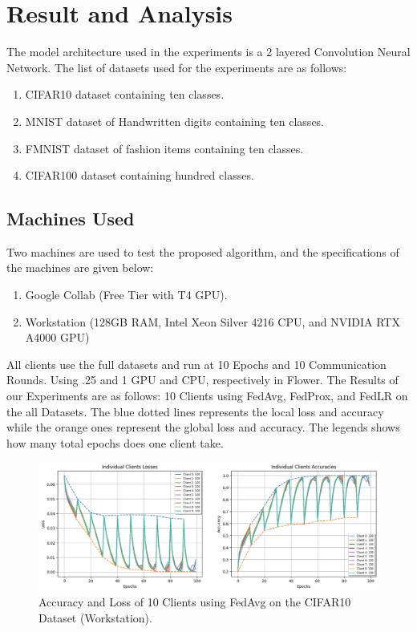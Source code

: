 \documentclass[conference]{IEEEtran}
\begin{document}
\section{Result and Analysis}
The model architecture used in the experiments is a 2 layered Convolution Neural Network. The list of datasets used for the experiments are as follows:
\begin{enumerate}
    \item CIFAR10 \cite{cifar10} dataset containing ten classes.
    \item MNIST \cite{lecun1998mnist} dataset of Handwritten digits containing ten classes. 
    \item FMNIST \cite{xiao2017fashionmnistnovelimagedataset} dataset of fashion items containing ten classes.
    \item CIFAR100 \cite{Krizhevsky09learningmultiple} dataset containing hundred classes. 
\end{enumerate}
\subsection{Machines Used}
Two machines are used to test the proposed algorithm, and the specifications of the machines are given below:
\begin{enumerate}
	\item Google Collab (Free Tier with T4 GPU).
	\item Workstation (128GB RAM, Intel Xeon Silver 4216 CPU, and NVIDIA RTX A4000 GPU)
\end{enumerate}

All clients use the full datasets and run at 10 Epochs and 10 Communication Rounds. Using .25 and 1 GPU and CPU, respectively in Flower. The Results of our Experiments are as follows:
10 Clients using FedAvg, FedProx, and FedLR on the all Datasets. The blue dotted lines represents the local loss and accuracy while the orange ones represent the global loss and accuracy. The legends shows how many total epochs does one client take.

\begin{figure}[htp!]
	\centering
	\includegraphics[scale=.28]{Images/Result Images/CIFAR 10/cifar10_fedavg_lossacc }
	\caption{Accuracy and Loss of 10 Clients using FedAvg on the CIFAR10 Dataset (Workstation).}
	\label{FedAvgC10}
\end{figure}
\end{document}

